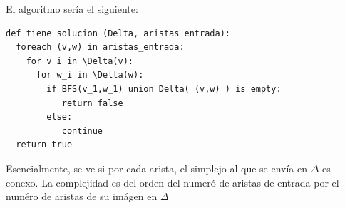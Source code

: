 \documentclass{article}
\begin{document}
\begin{enumerate}
El algoritmo sería el siguiente:
\begin{lstlisting}[frame=single]
def tiene_solucion (Delta, aristas_entrada):
  foreach (v,w) in aristas_entrada:
    for v_i in \Delta(v):
      for w_i in \Delta(w):
        if BFS(v_1,w_1) union Delta( (v,w) ) is empty:
           return false
        else:
           continue 
  return true    
\end{lstlisting}

Esencialmente, se ve si por cada arista, el simplejo al que se envía en $\Delta$ es conexo. La complejidad es del orden del numeró de aristas de entrada por el numéro de aristas de su imágen en $\Delta$
\end{enumerate}
\end{document}
